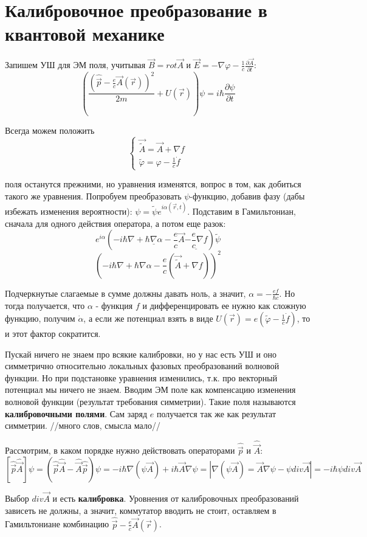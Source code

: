 \newpage
\chapter{Калибровочное преобразование в квантовой механике}
\par Запишем УШ для ЭМ поля, учитывая $\vec{B} = rot\vec{A}$ и $ \vec{E}= - \nabla \varphi - \frac{1}{c} \frac{\partial \vec{A}}{\partial t}$:
$$\left(\frac{\left(\hat{\vec{p}} - \frac{e}{c} \vec{A}(\vec{r}) \right)^2}{2m} + U(\vec{r})\right) \psi = i \hbar \frac{\partial \psi}{\partial t}$$
\par Всегда можем положить 
\begin{equation*}
 \begin{cases}
    \vec{\widetilde{A}} = \vec{A} + \nabla f
\\
    \widetilde{\varphi} = \varphi - \frac{1}{c} \dot{f}
 \end{cases}
\end{equation*}
\par поля останутся прежними, но уравнения изменятся, вопрос в том, как добиться такого же уравнения. Попробуем преобразовать $\psi$-функцию, добавив фазу (дабы избежать изменения вероятности): $\psi = \widetilde{\psi} e^{i \alpha(\vec{r},t)}$. Подставим в Гамильтониан, сначала для одного действия оператора, а потом еще разок:
$$e^{i\alpha} \left(-i \hbar \nabla + \underline{\hbar \nabla \alpha} - \frac{e}{c} \vec{A} \underline{- \frac{e}{c} \nabla f }\right) \widetilde{\psi}$$
$$\left(-i \hbar \nabla + \hbar \nabla \alpha- \frac{e}{c} (\vec{\widetilde{A}} + \nabla f) \right)^2$$
\par Подчеркнутые слагаемые в сумме должны давать ноль, а значит, $\alpha= - \frac{ef}{\hbar c}$. Но тогда получается, что $\alpha$ - функция $f$ и дифференцировать ее нужно как сложную функцию, получим $\dot{\alpha}$, а если же потенциал взять в виде $U(\vec{r})= e \left(\widetilde{\varphi}-\frac{1}{c} \dot{f} \right)$, то и этот фактор сократится.
\par Пускай ничего не знаем про всякие калибровки, но у нас есть УШ и оно симметрично относительно локальных фазовых преобразований волновой функции. Но при подстановке уравнения изменились, т.к. про векторный потенциал мы ничего не знаем. Вводим ЭМ поле как компенсацию изменения волновой функции (результат требования симметрии). Такие поля называются \textbf{калибровочными полями}. Сам заряд $e$ получается так же как результат симметрии. 
//много слов, смысла мало//
\par Рассмотрим, в каком порядке нужно действовать операторами $\hat{\vec{p}}$ и $\hat{\vec{A}}$:
$$[\hat{\vec{p}}\hat{\vec{A}}]\psi = (\hat{\vec{p}}\hat{\vec{A}} - \hat{\vec{A}}\hat{\vec{p}})\psi = -i \hbar \nabla(\psi \vec{A})+i \hbar \vec{A} \nabla \psi = \left|\nabla(\psi \vec{A} ) = \vec{A} \nabla \psi - \psi div \vec{A} \right| = -i \hbar \psi div \vec{A}$$
\par Выбор $div \vec{A}$  и есть \textbf{калибровка}. Уровнения от калибровочных преобразований зависеть не должны, а значит, коммутатор вводить не стоит, оставляем в Гамильтониане комбинацию $\hat{\vec{p}} - \frac{e}{c} \vec{A}(\vec{r})$. 

